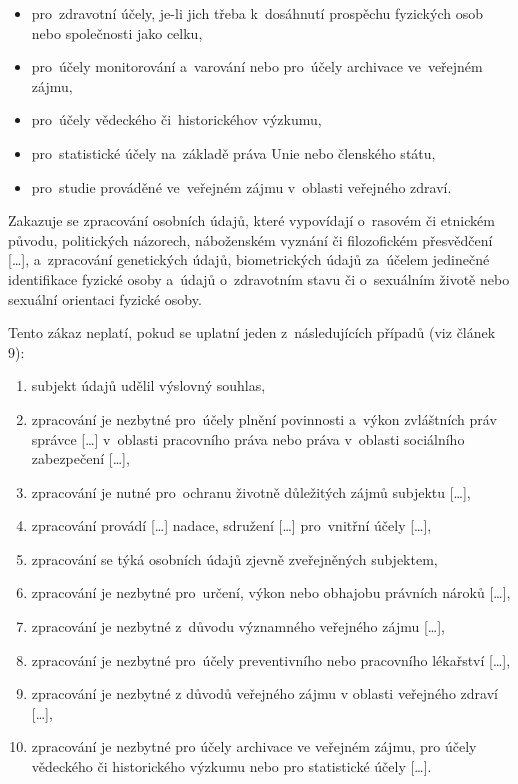 \begin{itemize}
\item pro~zdravotní účely, je-li jich třeba k~dosáhnutí prospěchu fyzických osob nebo společnosti jako celku,
\item pro~účely monitorování a~varování nebo pro~účely archivace ve~veřejném zájmu,
\item pro~účely vědeckého či~historickéhov výzkumu,
\item pro~statistické účely na~základě práva Unie nebo členského státu,
\item pro~studie prováděné ve~veřejném zájmu v~oblasti veřejného zdraví.
\end{itemize}

Zakazuje se zpracování osobních údajů, které vypovídají o~rasovém či etnickém původu, politických názorech, náboženském vyznání či filozofickém přesvědčení [\dots], a~zpracování genetických údajů, biometrických údajů za~účelem jedinečné identifikace fyzické osoby a~údajů o~zdravotním stavu či o~sexuálním životě nebo sexuální orientaci fyzické osoby.

Tento zákaz neplatí, pokud se uplatní jeden z~následujících případů (viz článek 9):

\begin{enumerate}[label=\alph*)]
\item subjekt údajů udělil výslovný souhlas,
\item zpracování je nezbytné pro~účely plnění povinnosti a~výkon zvláštních práv správce [\dots] v~oblasti pracovního práva nebo práva v~oblasti sociálního zabezpečení [\dots],
\item zpracování je nutné pro~ochranu životně důležitých zájmů subjektu [\dots],
\item zpracování provádí [\dots] nadace, sdružení [\dots] pro~vnitřní účely [\dots],
\item zpracování se týká osobních údajů zjevně zveřejněných subjektem,
\item zpracování je nezbytné pro~určení, výkon nebo obhajobu právních nároků [\dots],
\item zpracování je nezbytné z~důvodu významného veřejného zájmu [\dots],
\item zpracování je nezbytné pro~účely preventivního nebo pracovního lékařství [\dots],
\item zpracování je nezbytné z důvodů veřejného zájmu v oblasti veřejného zdraví [\dots],
\item zpracování je nezbytné pro účely archivace ve veřejném zájmu, pro účely vědeckého či historického výzkumu nebo pro statistické účely [\dots].
\end{enumerate}

